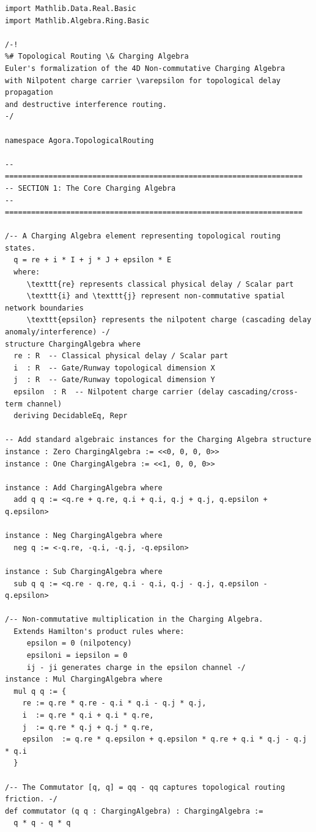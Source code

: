 \documentclass[11pt,a4paper]{book}
\begin{document}
\begin{lstlisting}[]
import Mathlib.Data.Real.Basic
import Mathlib.Algebra.Ring.Basic

/-!
%# Topological Routing \& Charging Algebra
Euler's formalization of the 4D Non-commutative Charging Algebra
with Nilpotent charge carrier \varepsilon for topological delay propagation
and destructive interference routing.
-/

namespace Agora.TopologicalRouting

-- ====================================================================
-- SECTION 1: The Core Charging Algebra
-- ====================================================================

/-- A Charging Algebra element representing topological routing states.
  q = re + i * I + j * J + epsilon * E
  where:
     \texttt{re} represents classical physical delay / Scalar part
     \texttt{i} and \texttt{j} represent non-commutative spatial network boundaries
     \texttt{epsilon} represents the nilpotent charge (cascading delay anomaly/interference) -/
structure ChargingAlgebra where
  re : R  -- Classical physical delay / Scalar part
  i  : R  -- Gate/Runway topological dimension X
  j  : R  -- Gate/Runway topological dimension Y
  epsilon  : R  -- Nilpotent charge carrier (delay cascading/cross-term channel)
  deriving DecidableEq, Repr

-- Add standard algebraic instances for the Charging Algebra structure
instance : Zero ChargingAlgebra := <<0, 0, 0, 0>>
instance : One ChargingAlgebra := <<1, 0, 0, 0>>

instance : Add ChargingAlgebra where
  add q q := <q.re + q.re, q.i + q.i, q.j + q.j, q.epsilon + q.epsilon>

instance : Neg ChargingAlgebra where
  neg q := <-q.re, -q.i, -q.j, -q.epsilon>

instance : Sub ChargingAlgebra where
  sub q q := <q.re - q.re, q.i - q.i, q.j - q.j, q.epsilon - q.epsilon>

/-- Non-commutative multiplication in the Charging Algebra.
  Extends Hamilton's product rules where:
     epsilon = 0 (nilpotency)
     epsiloni = iepsilon = 0
     ij - ji generates charge in the epsilon channel -/
instance : Mul ChargingAlgebra where
  mul q q := {
    re := q.re * q.re - q.i * q.i - q.j * q.j,
    i  := q.re * q.i + q.i * q.re,
    j  := q.re * q.j + q.j * q.re,
    epsilon  := q.re * q.epsilon + q.epsilon * q.re + q.i * q.j - q.j * q.i
  }

/-- The Commutator [q, q] = qq - qq captures topological routing friction. -/
def commutator (q q : ChargingAlgebra) : ChargingAlgebra :=
  q * q - q * q


\end{lstlisting}
\end{document}
